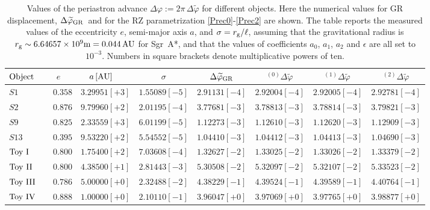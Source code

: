 \documentclass[a4paper,aps,twocolumn,showpacs,showkeys,nofootinbib,preprintnumbers,superscriptaddress,amsmath,amssymb,amsfonts]{revtex4-1}
\begin{document}
\begin{table*}
\centering
\caption{Values of the periastron advance $\Delta \varphi := 2\pi \, \Delta \widetilde{\varphi}$ for
different objects. Here the numerical values for GR displacement,
$\Delta\widetilde{\varphi}_{\rm GR}\,$ and for the RZ parametrization
\eqref{Prec0}-\eqref{Prec2} are shown.
The table reports the measured values of the eccentricity $e$,
semi-major axis $a$, and $\sigma=r_{\rm g}/\ell$, assuming that the
gravitational radius is $r_{\rm g}\sim6.64657 \times
10^9{\mathrm{m}}=0.044 \, \mathrm{AU}$ for Sgr~A*, and that the values 
of coefficients $a_0$, $a_1$, $a_2$ and $\epsilon$ are all set to
$10^{-3}$.
Numbers in square brackets denote multiplicative powers of ten.
}
\label{tab:1} 
\begin{tabular}{lccccccc}
\hline\hline
${\rm Object}\,$ &
$e\quad$ & $a \, [{\rm AU}] \quad $ & $\sigma$ &
$\Delta\widetilde{\varphi}_{\rm GR}$ & ${}^{(0)}\Delta\widetilde{\varphi}$ &  
${}^{(1)}\Delta\widetilde{\varphi}\,$ & ${}^{(2)}\Delta\widetilde{\varphi}$ \\
\hline
${S1}$ &
$0.358$& $3.29951 [+3]$ & $1.55089 [-5]$ &
$2.91131 [-4]$ & $2.92004 [-4]$ & $2.92005 [-4]$&
$2.92781 [-4]$ \\
\hline
${S2}$ &
$0.876$ & $9.79960 [+2]$ & $2.01195 [-4]$ &
$3.77681 [-3]$ & $3.78813 [-3]$ & $3.78814 [-3]$ &
$3.79821 [-3]$ \\
\hline
${S9}$ &
$0.825$ & $2.33559 [+3]$ & $6.01199 [-5]$ &
$1.12273 [-3]$ & $1.12610 [-3]$ & $1.12620 [-3]$ &
$1.12909 [-3]$ \\
\hline
${S13}$ &
$0.395$ & $9.53220 [+2]$ & $5.54552 [-5]$ &
$1.04410 [-3]$ & $1.04412 [-3]$ & $1.04413 [-3]$ &
$1.04690 [-3]$ \\
 \hline
${\rm Toy \ I}\quad$ &
$0.800$ & $1.75400 [+2]$ & $7.03608 [-4]$ &
$1.32627 [-2]$ & $1.33025 [-2]$ &
$1.33026 [-2]$ & $1.33379 [-2]$ \\
\hline
${\rm Toy \ II}\quad$ &
$0.800$ & $4.38500 [+1]$ & $2.81443 [-3]$ &
$5.30508 [-2]$ & $5.32097 [-2]$ &
$5.32107 [-2]$ & $5.33523 [-2]$ \\
\hline
${\rm Toy \ III}\quad$ &
$0.786$ & $ 5.00000 [+0]$ & $2.32488 [-2]$ &
$4.38229 [-1]$ & $4.39524 [-1]$ &
$4.39589 [-1]$ & $4.40764 [-1]$ \\
\hline
${\rm Toy \ IV}\quad$ & 
$0.888$ & $1.00000 [+0]$ & $2.10110 [-1]$ &
$3.96047 [+0]$ & $3.97069 [+0]$ &
$3.97765 [+0]$ & $3.98877 [+0]$ \\
\hline
\hline
\end{tabular}
\end{table*} 
\end{document}
